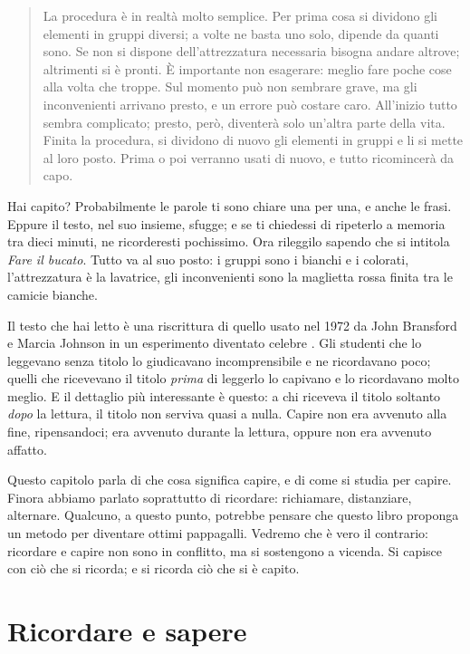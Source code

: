 \begin{quotation}\small
La procedura è in realtà molto semplice. Per prima cosa si dividono gli
elementi in gruppi diversi; a volte ne basta uno solo, dipende da
quanti sono. Se non si dispone dell'attrezzatura necessaria bisogna
andare altrove; altrimenti si è pronti. È importante non esagerare:
meglio fare poche cose alla volta che troppe. Sul momento può non
sembrare grave, ma gli inconvenienti arrivano presto, e un errore può
costare caro. All'inizio tutto sembra complicato; presto, però,
diventerà solo un'altra parte della vita. Finita la procedura, si
dividono di nuovo gli elementi in gruppi e li si mette al loro posto.
Prima o poi verranno usati di nuovo, e tutto ricomincerà da capo.
\end{quotation}

Hai capito? Probabilmente le parole ti sono chiare una per una, e
anche le frasi. Eppure il testo, nel suo insieme, sfugge; e se ti
chiedessi di ripeterlo a memoria tra dieci minuti, ne ricorderesti
pochissimo. Ora rileggilo sapendo che si intitola \emph{Fare il bucato}.
Tutto va al suo posto: i gruppi sono i bianchi e i colorati,
l'attrezzatura è la lavatrice, gli inconvenienti sono la maglietta
rossa finita tra le camicie bianche.

Il testo che hai letto è una riscrittura di quello usato nel 1972 da
John Bransford e Marcia Johnson in un esperimento diventato celebre
\parencite{bransford1972}. Gli studenti che lo leggevano senza titolo
lo giudicavano incomprensibile e ne ricordavano poco; quelli che
ricevevano il titolo \emph{prima} di leggerlo lo capivano e lo
ricordavano molto meglio. E il dettaglio più interessante è questo: a
chi riceveva il titolo soltanto \emph{dopo} la lettura, il titolo non
serviva quasi a nulla. Capire non era avvenuto alla fine, ripensandoci;
era avvenuto durante la lettura, oppure non era avvenuto affatto.

Questo capitolo parla di che cosa significa capire, e di come si studia
per capire. Finora abbiamo parlato soprattutto di ricordare: richiamare,
distanziare, alternare. Qualcuno, a questo punto, potrebbe pensare che
questo libro proponga un metodo per diventare ottimi pappagalli. Vedremo
che è vero il contrario: ricordare e capire non sono in conflitto, ma si
sostengono a vicenda. Si capisce con ciò che si ricorda; e si ricorda
ciò che si è capito.

\section{Ricordare e sapere}

